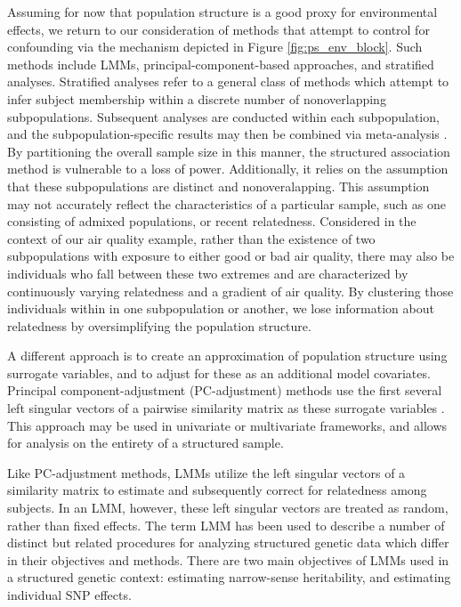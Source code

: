 Assuming for now that population structure is a good proxy for environmental effects, we return to our consideration of methods that attempt to control for confounding via the mechanism depicted in Figure \ref{fig:ps_env_block}. Such methods include LMMs, principal-component-based approaches, and stratified analyses. Stratified analyses refer to a general class of methods which attempt to infer subject membership within a discrete number of nonoverlapping subpopulations. Subsequent analyses are conducted within each subpopulation, and the subpopulation-specific results may then be combined via meta-analysis \citep{pritchard1999use, pritchard2000association}. By partitioning the overall sample size in this manner, the structured association method is vulnerable to a loss of power. Additionally, it relies on the assumption that these subpopulations are distinct and nonoveralapping. This assumption may not accurately reflect the characteristics of a particular sample, such as one consisting of admixed populations, or recent relatedness. Considered in the context of our air quality example, rather than the existence of two subpopulations with exposure to either good or bad air quality, there may also be individuals who fall between these two extremes and are characterized by continuously varying relatedness and a gradient of air quality. By clustering those individuals within in one subpopulation or another, we lose information about relatedness by oversimplifying the population structure.

A different approach is to create an approximation of population structure using surrogate variables, and to adjust for these as an additional model covariates. Principal component-adjustment (PC-adjustment) methods use the first several left singular vectors of a pairwise similarity matrix as these surrogate variables \citep{price2006principal}. This approach may be used in univariate or multivariate frameworks, and allows for analysis on the entirety of a structured sample. 

Like PC-adjustment methods, LMMs utilize the left singular vectors of a similarity matrix to estimate and subsequently correct for relatedness among subjects. In an LMM, however, these left singular vectors are treated as random, rather than fixed effects. The term LMM has been used to describe a number of distinct but related procedures for analyzing structured genetic data which differ in their objectives and methods. There are two main objectives of LMMs used in a structured genetic context: estimating narrow-sense heritability, and estimating individual SNP effects.

